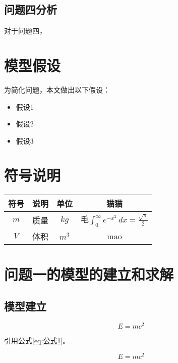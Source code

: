 \documentclass{cumcmthesis}
\begin{document}
\subsection{问题四分析}
对于问题四，


\section{模型假设}

为简化问题，本文做出以下假设：

\begin{itemize}[itemindent=2em]
\item 假设1
\item 假设2
\item 假设3
\end{itemize}


\section{符号说明}
\begin{table}[H]
\centering
\begin{tabularx}{\textwidth}{CCCC}%
\toprule
符号    & 说明    & 单位    & 猫猫 \\
\midrule
$m$     & 质量 & $kg$ & 毛$\int_{0}^{\infty} e^{-x^2} \, dx = \frac{\sqrt{\pi}}{2}$ \\
$V$     & 体积 & $m^3$  & mao  \\
\bottomrule
\end{tabularx}
\label{tab:符号说明}
\end{table}

\section{问题一的模型的建立和求解}
\subsection{模型建立}

$$
E = mc^2
$$

引用公式\cref{eq:公式1}。

\begin{equation}
\label{eq:公式1}
E = mc^2
\end{equation}
\end{document}
